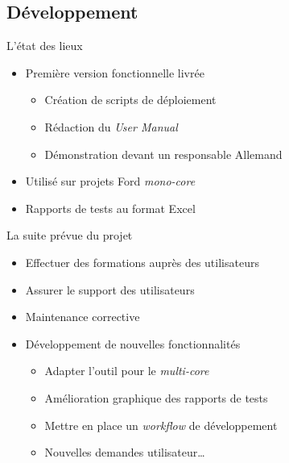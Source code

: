 \subsection{Développement}
\begin{frame}{L'état des lieux}
	\vfill
	\begin{itemize}
	\item Première version fonctionnelle livrée%
		\begin{itemize}
			\item Création de scripts de déploiement
			\item Rédaction du \textit{User Manual}
			\item Démonstration devant un responsable Allemand
		\end{itemize}
	\vfill
	\normalsize
	\item Utilisé sur projets Ford \textit{mono-core}%
	\vfill	
	\item Rapports de tests au format Excel%
	\end{itemize}
	\vfill
\end{frame}
\begin{frame}{La suite prévue du projet}
		\vfill
\begin{itemize}
	\item Effectuer des formations auprès des utilisateurs
	\vfill
	\item Assurer le support des utilisateurs
	\vfill
	\item Maintenance corrective
		\vfill
	\item Développement de nouvelles fonctionnalités
		\pause
	\begin{itemize}
		\item Adapter l'outil pour le \textit{multi-core}
		\item Amélioration graphique des rapports de tests
		\item Mettre en place un \textit{workflow} de développement
		\item Nouvelles demandes utilisateur\ldots
	\end{itemize}
\end{itemize}
	\vfill
\end{frame}

	
